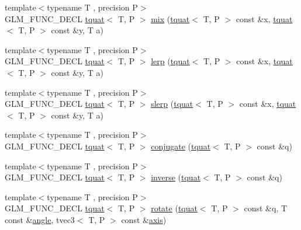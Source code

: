 \begin{DoxyCompactItemize}
\item 
{\footnotesize template$<$typename T , precision P$>$ }\\G\+L\+M\+\_\+\+F\+U\+N\+C\+\_\+\+D\+E\+C\+L \hyperlink{structglm_1_1tquat}{tquat}$<$ T, P $>$ \hyperlink{group__gtc__quaternion_ga31cc82178742c36450f5662bd4fb30b0}{mix} (\hyperlink{structglm_1_1tquat}{tquat}$<$ T, P $>$ const \&x, \hyperlink{structglm_1_1tquat}{tquat}$<$ T, P $>$ const \&y, T a)
\item 
{\footnotesize template$<$typename T , precision P$>$ }\\G\+L\+M\+\_\+\+F\+U\+N\+C\+\_\+\+D\+E\+C\+L \hyperlink{structglm_1_1tquat}{tquat}$<$ T, P $>$ \hyperlink{group__gtc__quaternion_ga5692804fa4db9e762a1c19b607e54435}{lerp} (\hyperlink{structglm_1_1tquat}{tquat}$<$ T, P $>$ const \&x, \hyperlink{structglm_1_1tquat}{tquat}$<$ T, P $>$ const \&y, T a)
\item 
{\footnotesize template$<$typename T , precision P$>$ }\\G\+L\+M\+\_\+\+F\+U\+N\+C\+\_\+\+D\+E\+C\+L \hyperlink{structglm_1_1tquat}{tquat}$<$ T, P $>$ \hyperlink{group__gtc__quaternion_ga22b438c7252f3fa5b773c9882471652a}{slerp} (\hyperlink{structglm_1_1tquat}{tquat}$<$ T, P $>$ const \&x, \hyperlink{structglm_1_1tquat}{tquat}$<$ T, P $>$ const \&y, T a)
\item 
{\footnotesize template$<$typename T , precision P$>$ }\\G\+L\+M\+\_\+\+F\+U\+N\+C\+\_\+\+D\+E\+C\+L \hyperlink{structglm_1_1tquat}{tquat}$<$ T, P $>$ \hyperlink{group__gtc__quaternion_gab1ace864fbf189ffa368950001808a3c}{conjugate} (\hyperlink{structglm_1_1tquat}{tquat}$<$ T, P $>$ const \&q)
\item 
{\footnotesize template$<$typename T , precision P$>$ }\\G\+L\+M\+\_\+\+F\+U\+N\+C\+\_\+\+D\+E\+C\+L \hyperlink{structglm_1_1tquat}{tquat}$<$ T, P $>$ \hyperlink{group__gtc__quaternion_ga5f47300c024c2d809944e6ac661d6d14}{inverse} (\hyperlink{structglm_1_1tquat}{tquat}$<$ T, P $>$ const \&q)
\item 
{\footnotesize template$<$typename T , precision P$>$ }\\G\+L\+M\+\_\+\+F\+U\+N\+C\+\_\+\+D\+E\+C\+L \hyperlink{structglm_1_1tquat}{tquat}$<$ T, P $>$ \hyperlink{group__gtc__quaternion_gaa8f42979c921e450ff2812fb43c25702}{rotate} (\hyperlink{structglm_1_1tquat}{tquat}$<$ T, P $>$ const \&q, T const \&\hyperlink{group__gtc__quaternion_gad4a4448baedb198b2b1e7880d2544dc9}{angle}, tvec3$<$ T, P $>$ const \&\hyperlink{group__gtc__quaternion_ga0b3e87a13b2708154b72259e50789a19}{axis})

\end{DoxyCompactItemize}
